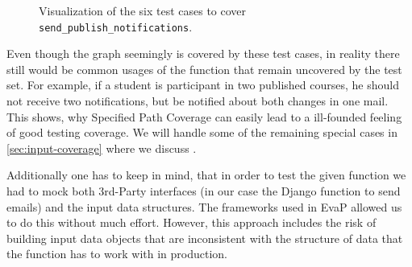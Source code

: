 \begin{figure}[htb]
{
	}
	\caption{Visualization of the six test cases to cover \texttt{send\_publish\_notifications}.}
	\label{fig:cfg-test-cases}
\end{figure}

Even though the graph seemingly is covered by these test cases, in reality there still would be common usages of the function that remain uncovered by the test set.
For example, if a student is participant in two published courses, he should not receive two notifications, but be notified about both changes in one mail.
This shows, why Specified Path Coverage can easily lead to a ill-founded feeling of good testing coverage.
We will handle some of the remaining special cases in \autoref{sec:input-coverage} where we discuss .

Additionally one has to keep in mind, that in order to test the given function we had to mock both 3rd-Party interfaces (in our case the Django function to send emails) and the input data structures.
The frameworks used in EvaP allowed us to do this without much effort.
However, this approach includes the risk of building input data objects that are inconsistent with the structure of data that the function has to work with in production.
